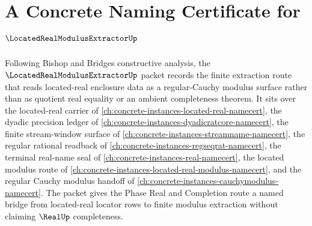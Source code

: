 \chapter{A Concrete Naming Certificate for $\LocatedRealModulusExtractorUp$}
\label{ch:concrete-instances-located-real-modulus-extractor-namecert}

Following Bishop and Bridges constructive analysis, the $\LocatedRealModulusExtractorUp$ packet records the finite extraction route that reads located-real enclosure data as a regular-Cauchy modulus surface rather than as quotient real equality or an ambient completeness theorem. It sits over the located-real carrier of \autoref{ch:concrete-instances-located-real-namecert}, the dyadic precision ledger of \autoref{ch:concrete-instances-dyadicratcore-namecert}, the finite stream-window surface of \autoref{ch:concrete-instances-streamname-namecert}, the regular rational readback of \autoref{ch:concrete-instances-regseqrat-namecert}, the terminal real-name seal of \autoref{ch:concrete-instances-real-namecert}, the located modulus route of \autoref{ch:concrete-instances-located-real-modulus-namecert}, and the regular Cauchy modulus handoff of \autoref{ch:concrete-instances-cauchymodulus-namecert}. The packet gives the Phase Real and Completion route a named bridge from located-real locator rows to finite modulus extraction without claiming $\RealUp$ completeness.

